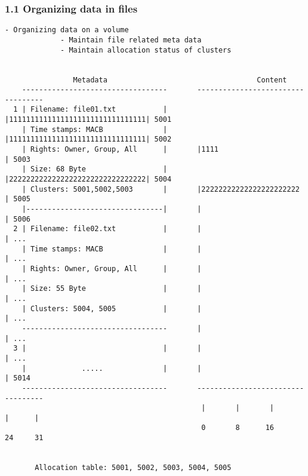 \begin{frame}[fragile]
  \frametitle{1.1 Organizing data in files}
  \begin{lstlisting}[basicstyle=\tiny\ttfamily]
             - Organizing data on a volume
             - Maintain file related meta data
             - Maintain allocation status of clusters
                            

                Metadata                                   Content     
    ----------------------------------       ----------------------------------
  1 | Filename: file01.txt           |       |11111111111111111111111111111111| 5001
    | Time stamps: MACB              |       |11111111111111111111111111111111| 5002
    | Rights: Owner, Group, All      |       |1111                            | 5003
    | Size: 68 Byte                  |       |22222222222222222222222222222222| 5004
    | Clusters: 5001,5002,5003       |       |22222222222222222222222         | 5005
    |--------------------------------|       |                                | 5006
  2 | Filename: file02.txt           |       |                                | ...
    | Time stamps: MACB              |       |                                | ...
    | Rights: Owner, Group, All      |       |                                | ...
    | Size: 55 Byte                  |       |                                | ...
    | Clusters: 5004, 5005           |       |                                | ...
    ----------------------------------       |                                | ...
  3 |                                |       |                                | ...
    |             .....              |       |                                | 5014
    ----------------------------------       ----------------------------------
                                              |       |       |       |      |
                                              0       8      16      24     31


       Allocation table: 5001, 5002, 5003, 5004, 5005
  \end{lstlisting}
\end{frame}


